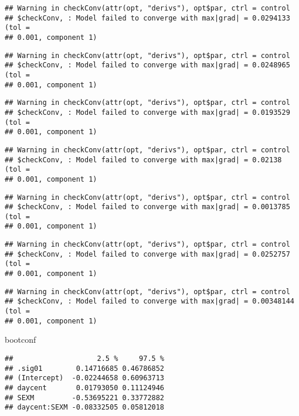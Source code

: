 \documentclass[]{article}
\newenvironment{Shaded}{\begin{snugshade}}{\end{snugshade}}
\newcommand{\NormalTok}[1]{#1}
\begin{document}
\begin{verbatim}
## Warning in checkConv(attr(opt, "derivs"), opt$par, ctrl = control
## $checkConv, : Model failed to converge with max|grad| = 0.0294133 (tol =
## 0.001, component 1)
\end{verbatim}

\begin{verbatim}
## Warning in checkConv(attr(opt, "derivs"), opt$par, ctrl = control
## $checkConv, : Model failed to converge with max|grad| = 0.0248965 (tol =
## 0.001, component 1)
\end{verbatim}

\begin{verbatim}
## Warning in checkConv(attr(opt, "derivs"), opt$par, ctrl = control
## $checkConv, : Model failed to converge with max|grad| = 0.0193529 (tol =
## 0.001, component 1)
\end{verbatim}

\begin{verbatim}
## Warning in checkConv(attr(opt, "derivs"), opt$par, ctrl = control
## $checkConv, : Model failed to converge with max|grad| = 0.02138 (tol =
## 0.001, component 1)
\end{verbatim}

\begin{verbatim}
## Warning in checkConv(attr(opt, "derivs"), opt$par, ctrl = control
## $checkConv, : Model failed to converge with max|grad| = 0.0013785 (tol =
## 0.001, component 1)
\end{verbatim}

\begin{verbatim}
## Warning in checkConv(attr(opt, "derivs"), opt$par, ctrl = control
## $checkConv, : Model failed to converge with max|grad| = 0.0252757 (tol =
## 0.001, component 1)
\end{verbatim}

\begin{verbatim}
## Warning in checkConv(attr(opt, "derivs"), opt$par, ctrl = control
## $checkConv, : Model failed to converge with max|grad| = 0.00348144 (tol =
## 0.001, component 1)
\end{verbatim}

\begin{Shaded}
\begin{Highlighting}[]
\NormalTok{bootconf}
\end{Highlighting}
\end{Shaded}

\begin{verbatim}
##                    2.5 %     97.5 %
## .sig01        0.14716685 0.46786852
## (Intercept)  -0.02244658 0.60963713
## daycent       0.01793050 0.11124946
## SEXM         -0.53695221 0.33772882
## daycent:SEXM -0.08332505 0.05812018
\end{verbatim}
\end{document}
